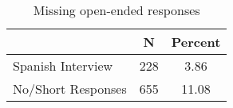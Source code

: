 \begin{table}[ht]
\centering
\caption{Missing open-ended responses} 
\label{tab:app_mis}
\begin{tabular}{lcc}
  \hline
 & N & Percent \\ 
  \hline
Spanish Interview & 228 & 3.86 \\ 
  No/Short Responses & 655 & 11.08 \\ 
   \hline
\end{tabular}
\end{table}
